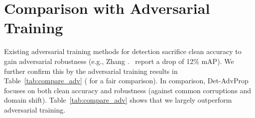 \documentclass[final]{cvpr}
\begin{document}
\begin{table}[!htb]
\centering
{}
\smallskip
\caption{The performance of the detectors trained by Det-AdvProp + AutoAugment on PASCAL VOC.}
\vspace{-10pt}
\label{tab:ap-aa-voc}
\end{table}

\section{Comparison with Adversarial Training}
\label{app:adv}
Existing adversarial training methods for detection sacrifice clean accuracy to gain adversarial robustness (e.g.,
Zhang \etal.~\cite{zhang2019towards} report a drop of 12\% mAP). We further confirm this by the adversarial training results in Table~\ref{tab:compare_adv} ( for a fair comparison).
In comparison, Det-AdvProp focuses on both clean accuracy and robustness (against common corruptions and domain shift). Table~\ref{tab:compare_adv} shows that we largely outperform adversarial training.
\end{document}
